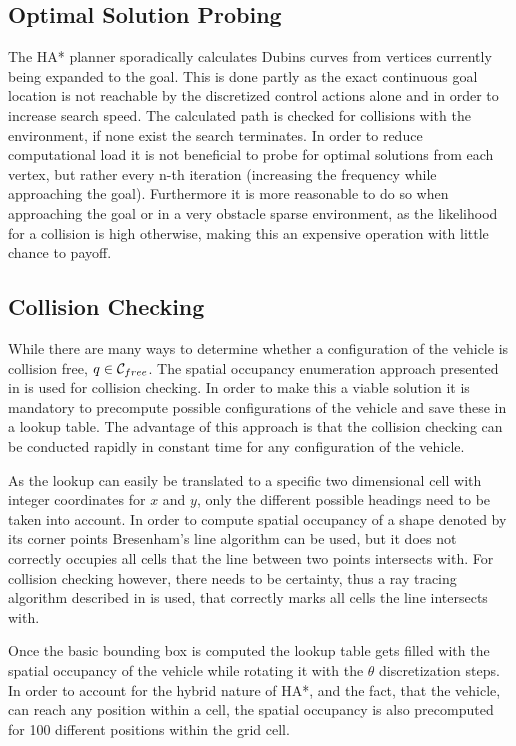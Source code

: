 \subsection{Optimal Solution Probing}
The HA* planner sporadically calculates Dubins curves from vertices currently being expanded to the goal. This is done partly as the exact continuous goal location is not reachable by the discretized control actions alone and in order to increase search speed. The calculated path is checked for collisions with the environment, if none exist the search terminates. In order to reduce computational load it is not beneficial to probe for optimal solutions from each vertex, but rather every n-th iteration (increasing the frequency while approaching the goal). Furthermore it is more reasonable to do so when approaching the goal or in a very obstacle sparse environment, as the likelihood for a collision is high otherwise, making this an expensive operation with little chance to payoff.

\subsection{Collision Checking}
While there are many ways to determine whether a configuration of the vehicle is collision free, $q \in \mathcal{C}_{free}$. The spatial occupancy enumeration approach presented in  is used for collision checking. In order to make this a viable solution it is mandatory to precompute possible configurations of the vehicle and save these in a lookup table. The advantage of this approach is that the collision checking can be conducted rapidly in constant time for any configuration of the vehicle.

As the lookup can easily be translated to a specific two dimensional cell with integer coordinates for $x$ and $y$, only the different possible headings need to be taken into account. In order to compute spatial occupancy of a shape denoted by its corner points Bresenham's line algorithm can be used, but it does not correctly occupies all cells that the line between two points intersects with. For collision checking however, there needs to be certainty, thus a ray tracing algorithm described in \cite{Amanatides.2011} is used, that correctly marks all cells the line intersects with.

Once the basic bounding box is computed the lookup table gets filled with the spatial occupancy of the vehicle while rotating it with the $\theta$ discretization steps. In order to account for the hybrid nature of HA*, and the fact, that the vehicle, can reach any position within a cell, the spatial occupancy is also precomputed for 100 different positions within the grid cell.

